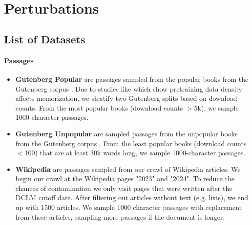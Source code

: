 \newpage
\section{Perturbations} 

\subsection{List of Datasets} \label{app:perturbation_datasets}

\paragraph{Passages}
\begin{itemize}
    \item {} \textbf{Gutenberg Popular} are passages sampled from the popular books from the Gutenberg corpus \citep{gerlach2018standardizedprojectgutenbergcorpus}. Due to studies like \cite{kirchenbauer2024lmd} which show pretraining data density affects memorization, we stratify two Gutenberg splits based on download counts. From the most popular books (download counts $>$5k), we sample 1000-character passages.
    
    \item {} \textbf{Gutenberg Unpopular} are sampled passages from the unpopular books from the Gutenberg corpus \citep{gerlach2018standardizedprojectgutenbergcorpus}. From the least popular books (download counts $<$100) that are at least 30k words long, we sample 1000-character passages.
    
    \item {} \textbf{Wikipedia} are passages sampled from our crawl of Wikipedia articles. We begin our crawl at the Wikipedia pages "2023" and "2024". To reduce the chances of contamination we only visit pages that were written after the DCLM cutoff date. After filtering out articles without text (e.g. lists), we end up with 1500 articles. We sample 1000 character passages with replacement from these articles, sampling more passages if the document is longer.
\end{itemize}

